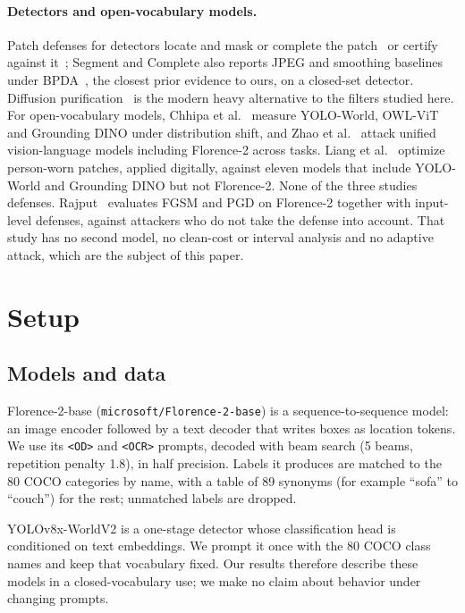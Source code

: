 \documentclass[11pt]{article}
\newcommand{\yw}{YOLO-World}
\newcommand{\fl}{Florence-2}
\begin{document}
\paragraph{Detectors and open-vocabulary models.}
Patch defenses for detectors locate and mask or complete the
patch~\cite{liu2022segment,xu2023patchzero} or certify against
it~\cite{xiang2021patchguard}; Segment and Complete also reports JPEG and
smoothing baselines under BPDA~\cite{liu2022segment}, the closest prior
evidence to ours, on a closed-set detector. Diffusion
purification~\cite{nie2022diffusion} is the modern heavy alternative to the
filters studied here. For open-vocabulary models, Chhipa et
al.~\cite{chhipa2024open} measure \yw{}, OWL-ViT and Grounding DINO under
distribution shift, and Zhao et al.~\cite{zhao2025one} attack unified
vision-language models including \fl{} across tasks. Liang et
al.~\cite{liang2026unified} optimize person-worn patches, applied digitally,
against eleven models that include \yw{} and Grounding DINO but not \fl{}.
None of the three studies defenses.
Rajput~\cite{rajput2026evaluating} evaluates FGSM and PGD on \fl{} together
with input-level defenses, against attackers who do not take the defense into
account. That study has no second model, no clean-cost or interval analysis
and no adaptive attack, which are the subject of this paper.

\section{Setup}
\label{sec:setup}

\subsection{Models and data}

\fl{}-base (\texttt{microsoft/Florence-2-base}) is a sequence-to-sequence
model: an image encoder followed by a text decoder that writes boxes as
location tokens. We use its \texttt{<OD>} and \texttt{<OCR>} prompts, decoded
with beam search (5 beams, repetition penalty 1.8), in half precision. Labels
it produces are matched to the 80 COCO categories by name, with a table of 89
synonyms (for example ``sofa'' to ``couch'') for the rest; unmatched labels
are dropped.

YOLOv8x-WorldV2 is a one-stage detector whose classification head is
conditioned on text embeddings. We prompt it once with the 80 COCO class names
and keep that vocabulary fixed. Our results therefore describe these models in
a closed-vocabulary use; we make no claim about behavior under changing
prompts.
\end{document}
